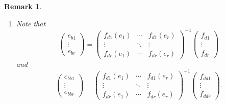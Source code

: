 \documentclass[aps,preprint]{revtex4}
\newtheorem{remark}[theorem]{Remark}
\begin{document}
\begin{remark}
\begin{enumerate}
\item Note that 
\begin{equation}
\left( 
\begin{array}{c}
e_{b1} \\ 
\vdots \\ 
e_{br}%
\end{array}%
\right) =\left( 
\begin{array}{ccc}
f_{d1}\left( e_{1}\right) & \cdots & f_{d1}\left( e_{r}\right) \\ 
\vdots & \ddots & \vdots \\ 
f_{dr}\left( e_{1}\right) & \cdots & f_{dr}\left( e_{r}\right)%
\end{array}%
\right) ^{-1}\left( 
\begin{array}{c}
f_{d1} \\ 
\vdots \\ 
f_{dr}%
\end{array}%
\right)
\end{equation}%
and 
\begin{equation}
\left( 
\begin{array}{c}
e_{bb1} \\ 
\vdots \\ 
e_{bbr}%
\end{array}%
\right) =\left( 
\begin{array}{ccc}
f_{d1}\left( e_{1}\right) & \cdots & f_{d1}\left( e_{r}\right) \\ 
\vdots & \ddots & \vdots \\ 
f_{dr}\left( e_{1}\right) & \cdots & f_{dr}\left( e_{r}\right)%
\end{array}%
\right) ^{-1}\left( 
\begin{array}{c}
f_{dd1} \\ 
\vdots \\ 
f_{ddr}%
\end{array}%
\right) .
\end{equation}


\end{enumerate}
\end{remark}
\end{document}
